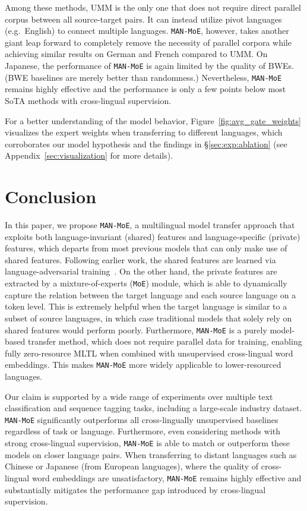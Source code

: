\documentclass[11pt,a4paper]{article}
\newcommand{\secref}[1]{\S\ref{#1}}
\newcommand{\manmoe}{\texttt{MAN-MoE}}
\newcommand{\moe}{\texttt{MoE}}
\begin{document}
Among these methods, UMM is the only one that does not require direct parallel corpus between all source-target pairs.
It can instead utilize pivot languages (e.g.~English) to connect multiple languages.
\manmoe{}, however, takes another giant leap forward to completely remove the necessity of parallel corpora while achieving similar results on German and French compared to UMM.
On Japanese, the performance of \manmoe{} is again limited by the quality of BWEs. (BWE baselines are merely better than randomness.)
Nevertheless, \manmoe{} remains highly effective and the performance is only a few points below most SoTA methods with cross-lingual supervision.

For a better understanding of the model behavior, Figure~\ref{fig:avg_gate_weights} visualizes the expert weights when transferring to different languages, which corroborates our model hypothesis and the findings in \secref{sec:exp:ablation} (see Appendix~\ref{sec:visualization} for more details).
 \section{Conclusion}\label{sec:conclusion}

In this paper, we propose \manmoe{}, a multilingual model transfer approach that exploits both language-invariant (shared) features and language-specific (private) features, which departs from most previous models that can only make use of shared features.
Following earlier work, the shared features are learned via language-adversarial training~\citep{chen2016adan}.
On the other hand, the private features are extracted by a mixture-of-experts (\moe{}) module, which is able to dynamically capture the relation between the target language and each source language on a token level.
This is extremely helpful when the target language is similar to a subset of source languages, in which case traditional models that solely rely on shared features would perform poorly.
Furthermore, \manmoe{} is a purely model-based transfer method, which does not require parallel data for training, enabling fully zero-resource MLTL when combined with unsupervised cross-lingual word embeddings.
This makes \manmoe{} more widely applicable to lower-resourced languages.

Our claim is supported by a wide range of experiments over multiple text classification and sequence tagging tasks, including a large-scale industry dataset.
\manmoe{} significantly outperforms all cross-lingually unsupervised baselines regardless of task or language.
Furthermore, even considering methods with strong cross-lingual supervision, \manmoe{} is able to match or outperform these models on closer language pairs.
When transferring to distant languages such as Chinese or Japanese (from European languages), where the quality of cross-lingual word embeddings are unsatisfactory, \manmoe{} remains highly effective and substantially mitigates the performance gap introduced by cross-lingual supervision.
\end{document}
